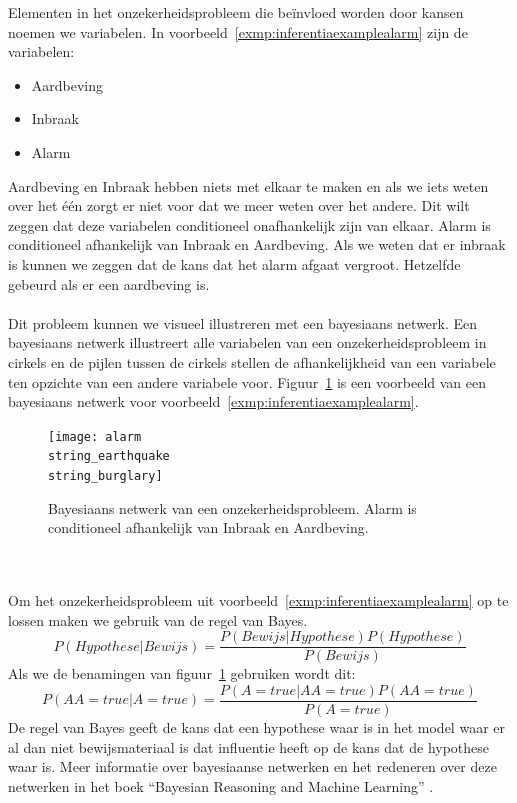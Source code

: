 \documentclass[12pt,a4paper,oneside]{book}
\theoremstyle{definition}
\newcommand{\quotes}[1]{``#1''}
\begin{document}
Elementen in het onzekerheidsprobleem die be\"{i}nvloed worden door kansen noemen we variabelen. In voorbeeld~\ref{exmp:inferentiaexamplealarm} zijn de variabelen:
\begin{itemize}
	\item Aardbeving
	\item Inbraak
	\item Alarm
\end{itemize}
Aardbeving en Inbraak hebben niets met elkaar te maken en als we iets weten over het \'{e}\'{e}n zorgt er niet voor dat we meer weten over het andere. Dit wilt zeggen dat deze variabelen conditioneel onafhankelijk zijn van elkaar. Alarm is conditioneel afhankelijk van Inbraak en Aardbeving. Als we weten dat er inbraak is kunnen we zeggen dat de kans dat het alarm afgaat vergroot. Hetzelfde gebeurd als er een aardbeving is.
\\\\
Dit probleem kunnen we visueel illustreren met een bayesiaans netwerk. Een bayesiaans netwerk illustreert alle variabelen van een onzekerheidsprobleem in cirkels en de pijlen tussen de cirkels stellen de afhankelijkheid van een variabele ten opzichte van een andere variabele voor. Figuur~\ref{figure:alarmearthquakeburglary} is een voorbeeld van een bayesiaans netwerk voor voorbeeld~\ref{exmp:inferentiaexamplealarm}. 
\begin{figure}
	\centering
	\texttt{[image: alarm\\string\_earthquake\\string\_burglary]}
	\caption{Bayesiaans netwerk van een onzekerheidsprobleem. Alarm is conditioneel afhankelijk van Inbraak en Aardbeving.}
	\label{figure:alarmearthquakeburglary}
\end{figure}
\\\\
Om het onzekerheidsprobleem uit voorbeeld~\ref{exmp:inferentiaexamplealarm} op te lossen maken we gebruik van de regel van Bayes.
\begin{equation} 
	\label{eq:bayesrule}
	P(Hypothese|Bewijs) = \frac{P(Bewijs|Hypothese)P(Hypothese)}{P(Bewijs)}
\end{equation}
Als we de benamingen van figuur~\ref{figure:alarmearthquakeburglary} gebruiken wordt dit:
\begin{equation} 
	\label{eq:bayesrule}
	P(AA=true|A=true) = \frac{P(A=true|AA=true)P(AA=true)}{P(A=true)}
\end{equation}
De regel van Bayes geeft de kans dat een hypothese waar is in het model waar er al dan niet bewijsmateriaal is dat influentie heeft op de kans dat de hypothese waar is. Meer informatie over bayesiaanse netwerken en het redeneren over deze netwerken in het boek \quotes{Bayesian Reasoning and Machine Learning} \cite{barberBRML2012}. 
\end{document}
